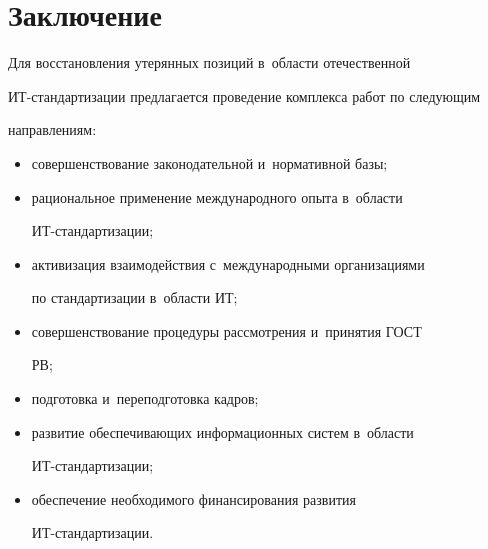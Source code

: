      


     \section{Заключение }


     


     \vspace*{-3pt}


     


      Для восстановления утерянных позиций в~области отечественной  


ИТ-стан\-дар\-ти\-зации предлагается проведение комплекса работ по следующим


направлениям: 


      \begin{itemize}


      \item  совершенствование законодательной и~нормативной базы;\\[-14pt]


      \item рациональное применение международного опыта в~области  


ИТ-стан\-дар\-ти\-за\-ции;\\[-14pt]


      \item активизация взаимодействия с~международными организациями 


по стандартизации в~области ИТ;\\[-14pt]


      \item совершенствование процедуры рассмотрения и~принятия ГОСТ 


РВ;\\[-14pt]


      \item подготовка и~переподготовка кадров;\\[-14pt]


      \item развитие обеспечивающих информационных систем в~области  


ИТ-стан\-дар\-ти\-за\-ции;\\[-14pt]


      \item обеспечение необходимого финансирования развития  


ИТ-стан\-дар\-ти\-за\-ции.


      \end{itemize}


